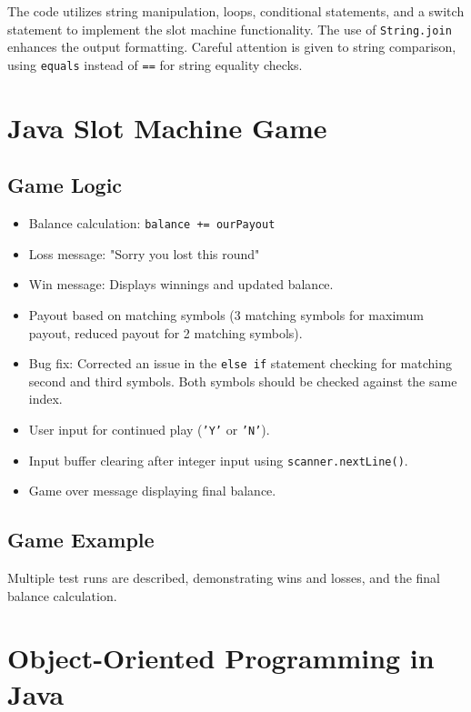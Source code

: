 \documentclass{article}
\begin{document}
The code utilizes string manipulation, loops, conditional statements, and a switch statement to implement the slot machine functionality.  The use of \texttt{String.join} enhances the output formatting.  Careful attention is given to string comparison, using \texttt{equals} instead of \texttt{==} for string equality checks.


\section{Java Slot Machine Game}

\subsection{Game Logic}

\begin{itemize}
    \item Balance calculation: \texttt{balance += ourPayout}
    \item Loss message: "Sorry you lost this round"
    \item Win message:  Displays winnings and updated balance.
    \item Payout based on matching symbols (3 matching symbols for maximum payout, reduced payout for 2 matching symbols).
    \item Bug fix: Corrected an issue in the \texttt{else if} statement checking for matching second and third symbols.  Both symbols should be checked against the same index.
    \item User input for continued play (\texttt{'Y'} or \texttt{'N'}).
    \item Input buffer clearing after integer input using \texttt{scanner.nextLine()}.
    \item Game over message displaying final balance.
\end{itemize}

\subsection{Game Example}

Multiple test runs are described, demonstrating wins and losses, and the final balance calculation.


\section{Object-Oriented Programming in Java}
\end{document}

